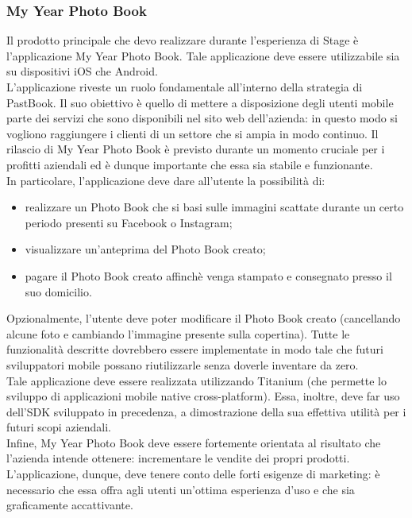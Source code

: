 			\subsubsection{My Year Photo Book}
				Il prodotto principale che devo realizzare durante l'esperienza di Stage è l'applicazione My Year Photo Book. Tale
				applicazione deve essere utilizzabile sia su dispositivi iOS che Android.\\
				L'applicazione riveste un ruolo fondamentale all'interno della strategia di PastBook. Il suo obiettivo è quello di
				mettere a disposizione degli utenti mobile parte dei servizi che sono disponibili nel sito web dell'azienda: in
				questo modo si vogliono raggiungere i clienti di un settore che si ampia in modo continuo. Il rilascio di My Year
				Photo Book è previsto durante un momento cruciale per i profitti aziendali ed è dunque importante che essa sia
				stabile e funzionante.\\
				In particolare, l'applicazione deve dare all'utente la possibilità di:
				\begin{itemize}
					\item realizzare un Photo Book che si basi sulle immagini scattate durante un certo periodo presenti
					su Facebook o Instagram;
					\item visualizzare un'anteprima del Photo Book creato;
					\item pagare il Photo Book creato affinchè venga stampato e consegnato presso il suo domicilio.
				\end{itemize}
				Opzionalmente, l'utente deve poter modificare il Photo Book creato (cancellando alcune foto e cambiando l'immagine
				presente sulla copertina). Tutte le funzionalità descritte dovrebbero essere implementate in modo tale che futuri
				sviluppatori mobile possano riutilizzarle senza doverle inventare da zero.\\
				Tale applicazione deve essere realizzata utilizzando Titanium (che permette lo sviluppo di applicazioni mobile native
				cross-platform). Essa, inoltre, deve far uso dell'SDK sviluppato in precedenza, a dimostrazione della sua effettiva
				utilità per i futuri scopi aziendali.\\
				Infine, My Year Photo Book deve essere fortemente orientata al risultato che l'azienda intende ottenere: incrementare
				le vendite dei propri prodotti. L'applicazione, dunque, deve tenere conto delle forti esigenze di marketing: è
				necessario che essa offra agli utenti un'ottima esperienza d'uso e che sia graficamente accattivante.

